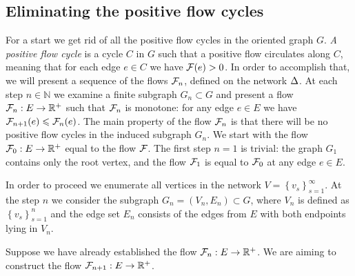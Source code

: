 \documentclass[12pt,oneside,a4paper]{amsart}
\begin{document}
      \subsection{Eliminating the positive flow cycles}
        For a start we get rid of all the positive flow cycles in the oriented graph $G$.
        \emph{A positive flow cycle} is a cycle $C$ in $G$ such that a positive flow circulates along $C$,
          meaning that for each edge $e \in C$ we have $\mathcal{F}(e) > 0$.
        In order to accomplish that, we will present a sequence of the flows $\mathcal{F}_{n}$,
          defined on the network $\Delta$.
        At each step $n \in \mathbb{N}$ we examine a finite subgraph $G_n \subset G$ and present a flow $\mathcal{F}_{n}: E \to \mathbb{R}^{+}$
          such that $\mathcal{F}_{n}$ is monotone: for any edge $e \in E$ we have $\mathcal{F}_{n+1}(e) \leqslant \mathcal{F}_{n}(e)$.
        The main property of the flow $\mathcal{F}_{n}$ is that there will be no positive flow cycles in the induced subgraph
        $G_n$.
        We start with the flow $\mathcal{F}_{0}:E \to \mathbb{R}^+$ equal to the flow $\mathcal{F}$.
        The first step $n = 1$ is trivial: the graph $G_1$ contains only the root vertex, and
          the flow $\mathcal{F}_{1}$ is equal to $\mathcal{F}_{0}$ at any edge $e \in E$.

        In order to proceed we enumerate all vertices in the network $V = \left\{v_s\right\}_{s=1}^\infty$.
        At the step $n$ we consider the subgraph $G_n = (V_n, E_n) \subset G$, where $V_n$ is defined as $\left\{v_s\right\}_{s=1}^n$
          and the edge set $E_n$ consists of the edges from $E$ with both endpoints lying in $V_n$.

        Suppose we have already established the flow $\mathcal{F}_{n}: E \to \mathbb{R}^{+}$.
        We are aiming to construct the flow $\mathcal{F}_{n+1}: E \to \mathbb{R}^{+}$.
\end{document}
